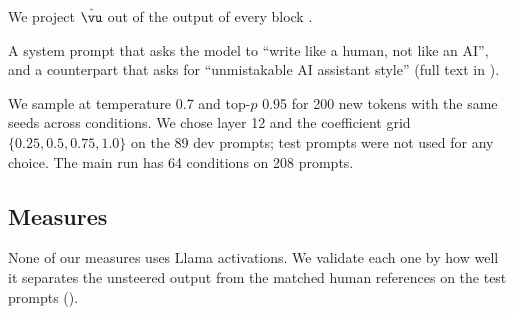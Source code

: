  We project $\hat{\vu}$ out of the output of every block \citep{arditi2024refusal}.

 A system prompt that asks the model to ``write like a human, not like an AI'', and a counterpart that asks for ``unmistakable AI assistant style'' (full text in ).

 We sample at temperature 0.7 and top-$p$ 0.95 for 200 new tokens with the same seeds across conditions.
We chose layer 12 and the coefficient grid $\{0.25, 0.5, 0.75, 1.0\}$ on the 89 dev prompts; test prompts were not used for any choice.
The main run has 64 conditions on 208 prompts.

\subsection{Measures}

None of our measures uses Llama activations.
We validate each one by how well it separates the unsteered output from the matched human references on the test prompts ().

\begin{table}[t]
\centering
\caption{Independent measures of AI-likeness and their validation on the 208 test prompts (unsteered output vs.\ matched human references). All pass the pre-specified AUROC $>0.8$ rule; our conclusions rest on the first three.}
\label{tab:detectors}
\end{table}

